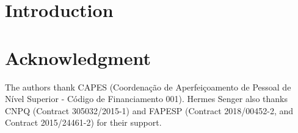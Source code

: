 \documentclass[conference]{lib/IEEEtran}
\begin{document}
\section{Introduction}

\section*{Acknowledgment}

The authors thank CAPES (Coordenação de Aperfeiçoamento de Pessoal de Nível Superior - Código de Financiamento 001).
Hermes Senger also thanks CNPQ (Contract 305032/2015-1) and FAPESP (Contract 2018/00452-2, and Contract 2015/24461-2) for their support.


\end{document}

